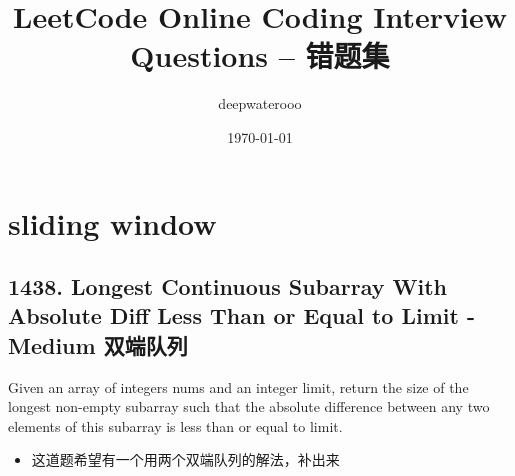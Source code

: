 \documentclass[9pt, b5paaper]{book}
\author{deepwaterooo}
\date{\today}
\title{LeetCode Online Coding Interview Questions -- 错题集}
\begin{document}
\maketitle
\tableofcontents


\chapter{sliding window}
\label{sec-1}
\section{1438. Longest Continuous Subarray With Absolute Diff Less Than or Equal to Limit - Medium 双端队列}
\label{sec-1-1}
Given an array of integers nums and an integer limit, return the size of the longest non-empty subarray such that the absolute difference between any two elements of this subarray is less than or equal to limit.

\begin{itemize}
\item 这道题希望有一个用两个双端队列的解法，补出来
\end{itemize}
\end{document}
